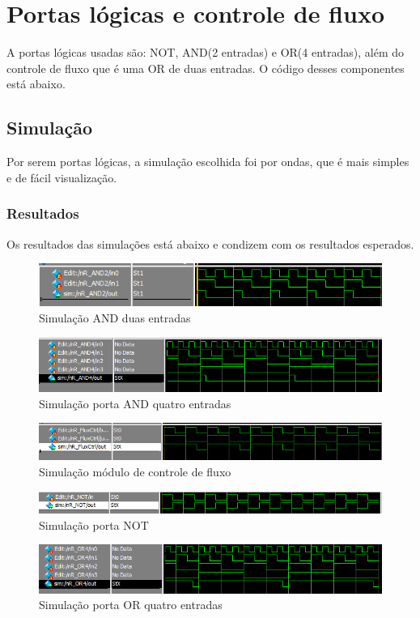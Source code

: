 \documentclass[a4paper, 10pt]{article}
\begin{document}
\section{Portas lógicas e controle de fluxo}
A portas lógicas usadas são: NOT, AND(2 entradas) e OR(4 entradas), além do controle de fluxo que é uma OR de duas entradas. O código desses componentes está abaixo.

\subsection{Simulação}
Por serem portas lógicas, a simulação escolhida foi por ondas, que é mais simples e de fácil visualização.
\subsubsection{Resultados}
Os resultados das simulações está abaixo e condizem com os resultados esperados.
\begin{figure}[H]
	\centering
	\includegraphics[scale=0.7]{simuAND2.PNG}
	\caption{Simulação AND duas entradas}
	\label{Rotulo}
\end{figure}
\begin{figure}[H]
	\centering
	\includegraphics[scale=0.7]{simuAND4.PNG}
	\caption{Simulação porta AND quatro entradas}
	\label{Rotulo}
\end{figure}
\begin{figure}[H]
	\centering
	\includegraphics[scale=0.7]{simuFLUXCTRL.PNG}
	\caption{Simulação módulo de controle de fluxo}
	\label{Rotulo}
\end{figure}
\begin{figure}[H]
	\centering
	\includegraphics[scale=0.7]{simuNOT.PNG}
	\caption{Simulação porta NOT}
	\label{Rotulo}
\end{figure}
\begin{figure}[H]
	\centering
	\includegraphics[scale=0.7]{simuOR4.PNG}
	\caption{Simulação porta OR quatro entradas}
	\label{Rotulo}
\end{figure}
\end{document}
